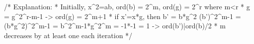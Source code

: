 /* Explanation:
 * Initially, x^2=ab, ord(b) = 2^m, ord(g) = 2^r where m<r
 * g = g^{2^{r-m-1}} -> ord(g) = 2^{m+1}
 * if x'=x*g, then b' = b*g^2
		(b')^{2^{m-1}} = (b*g^2)^{2^{m-1}}
					   = b^{2^{m-1}}*g^{2^m}
					   = -1*-1
					   = 1
	-> ord(b')|ord(b)/2
 * m decreases by at least one each iteration
 */